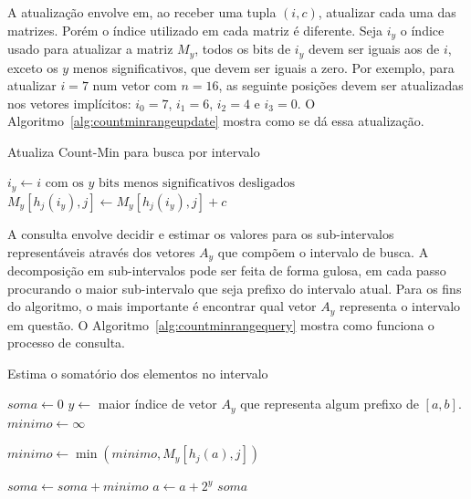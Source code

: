 A atualização envolve em, ao receber uma tupla $(i, c)$, atualizar cada uma das matrizes. Porém o índice utilizado em cada matriz é diferente. Seja $i_y$ o índice usado para atualizar a matriz $M_y$, todos os bits de $i_y$ devem ser iguais aos de $i$, exceto os $y$ menos significativos, que devem ser iguais a zero. Por exemplo, para atualizar $i=7$ num vetor com $n=16$, as seguinte posições devem ser atualizadas nos vetores implícitos: $i_0 = 7$, $i_1=6$, $i_2=4$ e $i_3=0$. O Algoritmo~\ref{alg:countminrangeupdate} mostra como se dá essa atualização.

\begin{algorithm}
\linespread{1}\selectfont
\caption{Atualiza Count-Min para busca por intervalo}
\label{alg:countminrangeupdate}
\begin{algorithmic}[1]
        \State $i_y \gets i \textrm{ com os } y \textrm{ bits menos significativos desligados}$
            \State $M_y[h_j(i_y), j] \gets M_y[h_j(i_y), j] + c$
    	\EndFor
	\EndFor
\EndProcedure
\end{algorithmic}
\end{algorithm}

A consulta envolve decidir e estimar os valores para os sub-intervalos representáveis através dos vetores $A_y$ que compõem o intervalo de busca. A decomposição em sub-intervalos pode ser feita de forma gulosa, em cada passo procurando o maior sub-intervalo que seja prefixo do intervalo atual. Para os fins do algoritmo, o mais importante é encontrar qual vetor $A_y$ representa o intervalo em questão. O Algoritmo~\ref{alg:countminrangequery} mostra como funciona o processo de consulta.

\begin{algorithm}
\linespread{1}\selectfont
\caption{Estima o somatório dos elementos no intervalo}
\label{alg:countminrangequery}
\begin{algorithmic}[1]
    \State $soma \gets 0$
        \State $y \gets $ maior índice de vetor $A_y$ que representa algum prefixo de $[a, b]$.
        \State $minimo \gets \infty$
        
            \State $minimo \gets \min(minimo, M_y[h_j(a), j])$
    	\EndFor
    	
    	\State $soma \gets soma + minimo$
    	\State $a \gets a + 2^y$
    \EndWhile
    \Return $soma$
\EndFunction
\end{algorithmic}
\end{algorithm}

